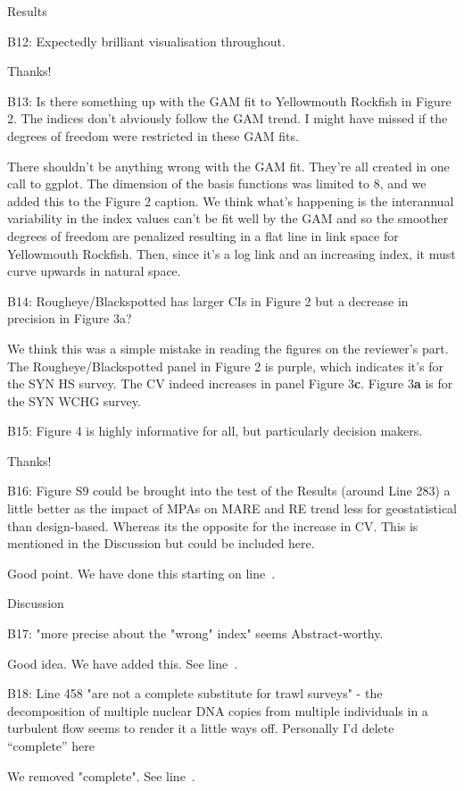 \documentclass[12pt]{article}
\newcommand{\rev}[1]{{\color{niceblue} #1}}
\newcommand{\lr}[1]{line~\lineref{#1}}
\begin{document}
\rev{Results}

\rev{B12: Expectedly brilliant visualisation throughout.}

Thanks!

\rev{B13: Is there something up with the GAM fit to Yellowmouth Rockfish in Figure 2. The indices don’t abviously follow the GAM trend. I might have missed if the degrees of freedom were restricted in these GAM fits.}

There shouldn't be anything wrong with the GAM fit. They're all created in one call to ggplot. The dimension of the basis functions was limited to 8, and we added this to the Figure 2 caption. We think what's happening is the interannual variability in the index values can't be fit well by the GAM and so the smoother degrees of freedom are penalized resulting in a flat line in link space for Yellowmouth Rockfish. Then, since it's a log link and an increasing index, it must curve upwards in natural space.

\rev{B14: Rougheye/Blackspotted has larger CIs in Figure 2 but a decrease in precision in
Figure 3a?}

We think this was a simple mistake in reading the figures on the reviewer's part. The Rougheye/Blackspotted panel in Figure 2 is purple, which indicates it's for the SYN HS survey. The CV indeed increases in panel Figure 3\textbf{c}. Figure 3\textbf{a} is for the SYN WCHG survey.

\rev{B15: Figure 4 is highly informative for all, but particularly decision makers.}

Thanks!

\rev{B16: Figure S9 could be brought into the test of the Results (around Line 283) a little better as the impact of MPAs on MARE and RE trend less for geostatistical than design-based. Whereas its the opposite for the increase in CV. This is mentioned in the Discussion but could be included here.}

Good point. We have done this starting on \lr{B16}.

\rev{Discussion}

\rev{B17: "more precise about the "wrong" index" seems Abstract-worthy.}

Good idea. We have added this. See \lr{B17}.

\rev{B18: Line 458 "are not a complete substitute for trawl surveys" - the decomposition of multiple nuclear DNA copies from multiple individuals in a turbulent flow seems to render it a little ways off. Personally I’d delete ``complete'' here}

We removed "complete". See \lr{B18}.
\end{document}
